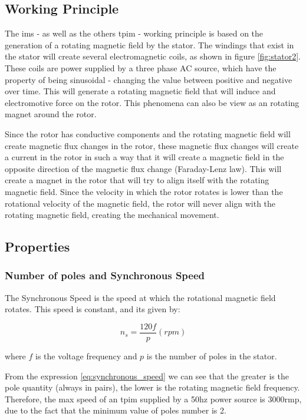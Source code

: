 \subsection{Working Principle}

The \acrfull{ims} - as well as the others \acrfull{tpim} - working principle is based on the generation of a rotating magnetic field by the stator. The windings that exist in the stator will create several electromagnetic coils, as shown in figure \ref{fig:stator2}. These coils are power supplied by a three phase AC source, which have the property of being sinusoidal - changing the value between positive and negative over time. This will generate a rotating magnetic field that will induce and electromotive force on the rotor. 
This phenomena can also be view as an rotating magnet around the rotor. 

Since the rotor has conductive components and the rotating magnetic field will create magnetic flux changes in the rotor, these magnetic flux changes will create a current in the rotor in such a way that it will create a magnetic field in the opposite direction of the magnetic flux change (Faraday-Lenz law).
This will create a magnet in the rotor that will try to align itself with the rotating magnetic field.
Since the velocity in which the rotor rotates is lower than the rotational velocity of the magnetic field, the rotor will never align with the rotating magnetic field, creating the mechanical movement.

\subsection{Properties}

\subsubsection{Number of poles and Synchronous Speed}

The Synchronous Speed is the speed at which the rotational magnetic field rotates. This speed is constant, and its given by:

\begin{equation} \label{eq:synchronous_speed}
	 n_{s} = \frac{120f}{p}(rpm)
\end{equation}

where $f$ is the voltage frequency and $p$ is the number of poles in the stator.

From the expression \ref{eq:synchronous_speed} we can see that the greater is the pole quantity (always in pairs), the lower is the rotating magnetic field frequency.
Therefore, the max speed of an \acrshort{tpim} supplied by a 50hz power source is 3000rmp, due to the fact that the minimum value of poles number is 2.


